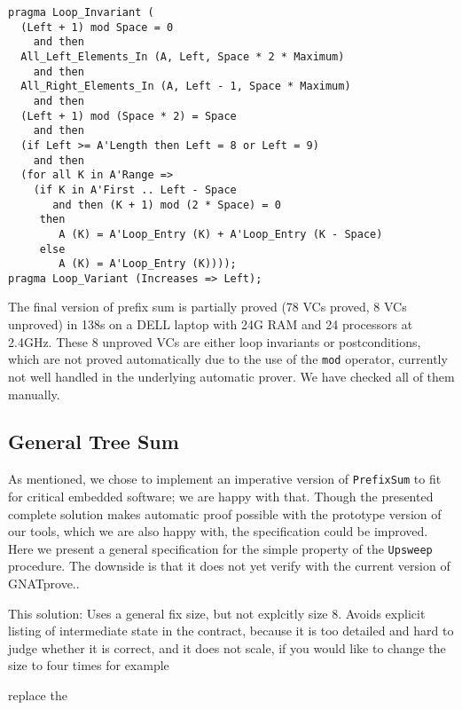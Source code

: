 \documentclass[sttt,draft]{svjour}
\newcommand{\gnatprove}{GNATprove\xspace}
\begin{document}
\begin{footnotesize}
\begin{verbatim}
pragma Loop_Invariant (
  (Left + 1) mod Space = 0
    and then
  All_Left_Elements_In (A, Left, Space * 2 * Maximum)
    and then
  All_Right_Elements_In (A, Left - 1, Space * Maximum)
    and then
  (Left + 1) mod (Space * 2) = Space
    and then
  (if Left >= A'Length then Left = 8 or Left = 9)
    and then
  (for all K in A'Range =>
    (if K in A'First .. Left - Space
       and then (K + 1) mod (2 * Space) = 0
     then
        A (K) = A'Loop_Entry (K) + A'Loop_Entry (K - Space)
     else
        A (K) = A'Loop_Entry (K))));
pragma Loop_Variant (Increases => Left);
\end{verbatim}
\end{footnotesize}

The final version of prefix sum is partially proved (78 VCs proved, 8 VCs
unproved) in 138s on a DELL laptop with 24G RAM and 24 processors at 2.4GHz.
These 8 unproved VCs are either loop invariants or postconditions, which are
not proved automatically due to the use of the \verb|mod| operator, currently
not well handled in the underlying automatic prover. We have checked all of
them manually.

\subsection{General  Tree Sum}
As mentioned, we chose to implement an imperative version of
\verb|PrefixSum| to fit for critical embedded software; we are happy
with that. Though the presented complete solution makes automatic
proof possible with the prototype version of our tools, which we are
also happy with, the specification could be improved. Here we present
a general specification for the simple property of the \verb|Upsweep|
procedure.  The downside is that it does not yet verify with the
current version of \gnatprove..

This solution: Uses a general fix size, but not explcitly size 8.
Avoids explicit listing of intermediate state in the contract, because
it is too detailed and hard to judge whether it is correct, and it
does not scale, if you would like to change the size to four times for
example

replace the
\end{document}
